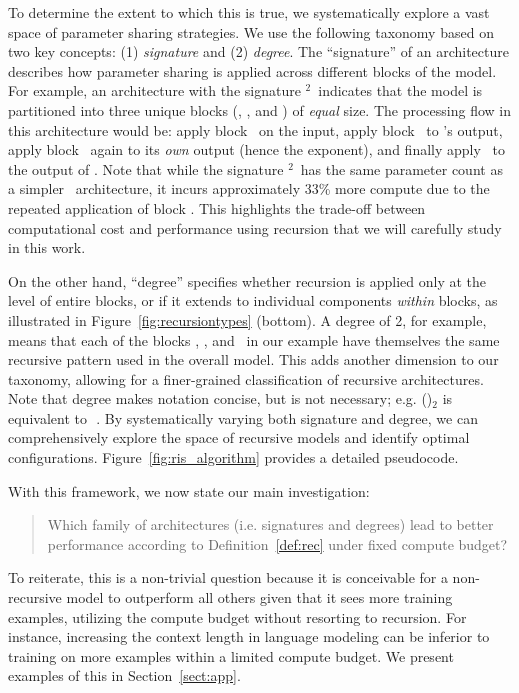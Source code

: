 To determine the extent to which this is true, we systematically explore a vast space of parameter sharing strategies. We use the following taxonomy based on two key concepts: (1) \emph{signature} and (2) \emph{degree}. The ``signature'' of an architecture describes how parameter sharing is applied across different blocks of the model. For example, an architecture with the signature \A\B$^2$\C\ indicates that the model is partitioned into three unique blocks (\A, \B, and \C) of \emph{equal} size. The processing flow in this architecture would be: apply block \A\ on the input, apply block \B\ to \A's output, apply block \B\ again to its \emph{own} output (hence the exponent), and finally apply \C\ to the output of \B.  Note that while the signature \A\B$^2$\C\ has the same parameter count as a simpler \A\B\C\ architecture, it incurs approximately 33\% more compute due to the repeated application of block \B. This highlights the trade-off between computational cost and performance using recursion that we will carefully study in this work.

On the other hand, ``degree'' specifies whether recursion is applied only at the level of entire blocks, or if it extends to individual components \emph{within} blocks, as illustrated in Figure~\ref{fig:recursiontypes} (bottom). A degree of 2, for example, means that each of the blocks \A, \B, and \C\ in our example have themselves the same recursive pattern used in the overall model. This adds another dimension to our taxonomy, allowing for a finer-grained classification of recursive architectures. Note that degree makes notation concise, but is not necessary; e.g. (\A\B\B)$_2$ is equivalent to \A\B\B\,\C\D\D\,\C\D\D.  By systematically varying both signature and degree, we can comprehensively explore the space of recursive models and identify optimal configurations. Figure~\ref{fig:ris_algorithm} provides a detailed pseudocode.

With this framework, we now state our main investigation: 
\begin{quote}
    Which family of architectures (i.e. signatures and degrees) lead to better performance according to Definition~\ref{def:rec} under fixed compute budget?
\end{quote}
To reiterate, this is a non-trivial question because it is conceivable for a non-recursive model to outperform all others given that it sees more training examples, utilizing the  compute budget without resorting to recursion. For instance, increasing the context length in language modeling can be inferior to training on more examples within a limited compute budget. We present examples of this in Section~\ref{sect:app}.

